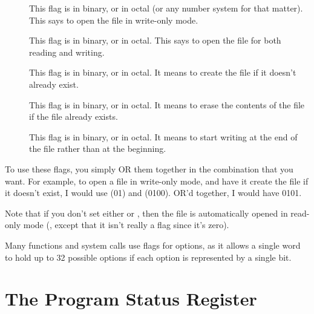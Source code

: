 \begin{description}

\item[] This flag is  in binary, or  in octal (or any number system for that matter).  This says to open the file in write-only mode.
\item[] This flag is  in binary, or  in octal.  This says to open the file for both reading and writing.
\item[] This flag is  in binary, or  in octal.  It means to create the file if it doesn't already exist.
\item[] This flag is  in binary, or  in octal.  It means to erase the contents of the file if the file already exists.
\item[] This flag is  in binary, or  in octal.  It means to start writing at the end of the file rather than at the beginning.
\end{description}

To use these flags, you simply OR them together in the combination that you 
want.  For example, to open a file in write-only mode, and have it create the
file if it doesn't exist, I would use  (01) and 
 (0100).  OR'd together, I would have 0101.

Note that if you don't set either  or , then the file is automatically opened in read-only mode (, except that it isn't really a flag since it's zero).  

Many functions and system calls use flags for options, as it allows a single
word to hold up to 32 possible options if each option is represented by a
single bit.

\section{The Program Status Register}

